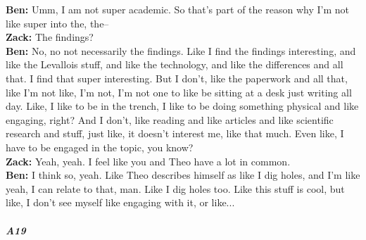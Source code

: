 \documentclass[
]{article}
\begin{document}
\textbf{Ben:} Umm, I am not super academic. So that's part of the reason
why I'm not like super into the, the--\\
\textbf{Zack:} The findings?\\
\textbf{Ben:} No, no not necessarily the findings. Like I find the
findings interesting, and like the Levallois stuff, and like the
technology, and like the differences and all that. I find that super
interesting. But I don't, like the paperwork and all that, like I'm not
like, I'm not, I'm not one to like be sitting at a desk just writing all
day. Like, I like to be in the trench, I like to be doing something
physical and like engaging, right? And I don't, like reading and like
articles and like scientific research and stuff, just like, it doesn't
interest me, like that much. Even like, I have to be engaged in the
topic, you know?\\
\textbf{Zack:} Yeah, yeah. I feel like you and Theo have a lot in
common.\\
\textbf{Ben:} I think so, yeah. Like Theo describes himself as like I
dig holes, and I'm like yeah, I can relate to that, man. Like I dig
holes too. Like this stuff is cool, but like, I don't see myself like
engaging with it, or like...

\subparagraph{A19}\label{sec-A19}
\end{document}
